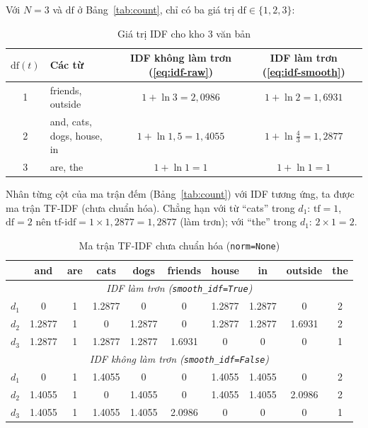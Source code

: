 \begin{example}
Với $N = 3$ và $\mathrm{df}$ ở Bảng~\ref{tab:count}, chỉ có ba giá trị $\mathrm{df} \in \{1, 2, 3\}$:
\end{example}

\begin{table}[H]
\centering
\begin{tabular}{|c|l|c|c|}
\hline
$\mathrm{df}(t)$ & \textbf{Các từ} & \textbf{IDF không làm trơn (\ref{eq:idf-raw})} & \textbf{IDF làm trơn (\ref{eq:idf-smooth})} \\
\hline
1 & friends, outside & $1 + \ln 3 = 2{,}0986$ & $1 + \ln 2 = 1{,}6931$ \\
\hline
2 & and, cats, dogs, house, in & $1 + \ln 1{,}5 = 1{,}4055$ & $1 + \ln \tfrac{4}{3} = 1{,}2877$ \\
\hline
3 & are, the & $1 + \ln 1 = 1$ & $1 + \ln 1 = 1$ \\
\hline
\end{tabular}
\caption{Giá trị IDF cho kho 3 văn bản}
\label{tab:idf}
\end{table}

Nhân từng cột của ma trận đếm (Bảng~\ref{tab:count}) với IDF tương ứng, ta được ma trận TF-IDF (chưa chuẩn hóa). Chẳng hạn với từ ``cats'' trong $d_1$: $\mathrm{tf} = 1$, $\mathrm{df} = 2$ nên $\text{tf-idf} = 1 \times 1{,}2877 = 1{,}2877$ (làm trơn); với ``the'' trong $d_1$: $2 \times 1 = 2$.

\begin{table}[H]
\centering
\small
\begin{tabular}{|l|c|c|c|c|c|c|c|c|c|}
\hline
 & and & are & cats & dogs & friends & house & in & outside & the \\
\hline
\multicolumn{10}{|c|}{\textit{IDF làm trơn (\texttt{smooth\_idf=True})}} \\
\hline
$d_1$ & 0 & 1 & 1.2877 & 0 & 0 & 1.2877 & 1.2877 & 0 & 2 \\ \hline
$d_2$ & 1.2877 & 1 & 0 & 1.2877 & 0 & 1.2877 & 1.2877 & 1.6931 & 2 \\ \hline
$d_3$ & 1.2877 & 1 & 1.2877 & 1.2877 & 1.6931 & 0 & 0 & 0 & 1 \\ \hline
\multicolumn{10}{|c|}{\textit{IDF không làm trơn (\texttt{smooth\_idf=False})}} \\
\hline
$d_1$ & 0 & 1 & 1.4055 & 0 & 0 & 1.4055 & 1.4055 & 0 & 2 \\ \hline
$d_2$ & 1.4055 & 1 & 0 & 1.4055 & 0 & 1.4055 & 1.4055 & 2.0986 & 2 \\ \hline
$d_3$ & 1.4055 & 1 & 1.4055 & 1.4055 & 2.0986 & 0 & 0 & 0 & 1 \\ \hline
\end{tabular}
\caption{Ma trận TF-IDF chưa chuẩn hóa (\texttt{norm=None})}
\label{tab:tfidf}
\end{table}

